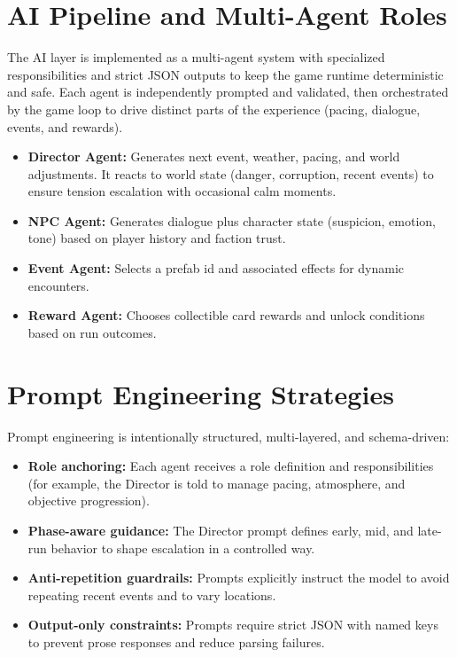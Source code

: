 \documentclass[12pt]{article}
\begin{document}
\section*{AI Pipeline and Multi-Agent Roles}
The AI layer is implemented as a multi-agent system with specialized responsibilities and strict JSON outputs to keep the game runtime deterministic and safe. Each agent is independently prompted and validated, then orchestrated by the game loop to drive distinct parts of the experience (pacing, dialogue, events, and rewards).
\begin{itemize}[leftmargin=1.1em]
  \item \textbf{Director Agent:} Generates next event, weather, pacing, and world adjustments. It reacts to world state (danger, corruption, recent events) to ensure tension escalation with occasional calm moments.
  \item \textbf{NPC Agent:} Generates dialogue plus character state (suspicion, emotion, tone) based on player history and faction trust.
  \item \textbf{Event Agent:} Selects a prefab id and associated effects for dynamic encounters.
  \item \textbf{Reward Agent:} Chooses collectible card rewards and unlock conditions based on run outcomes.
\end{itemize}

\section*{Prompt Engineering Strategies}
Prompt engineering is intentionally structured, multi-layered, and schema-driven:
\begin{itemize}[leftmargin=1.1em]
  \item \textbf{Role anchoring:} Each agent receives a role definition and responsibilities (for example, the Director is told to manage pacing, atmosphere, and objective progression).
  \item \textbf{Phase-aware guidance:} The Director prompt defines early, mid, and late-run behavior to shape escalation in a controlled way.
  \item \textbf{Anti-repetition guardrails:} Prompts explicitly instruct the model to avoid repeating recent events and to vary locations.
  \item \textbf{Output-only constraints:} Prompts require strict JSON with named keys to prevent prose responses and reduce parsing failures.
\end{itemize}
\end{document}
